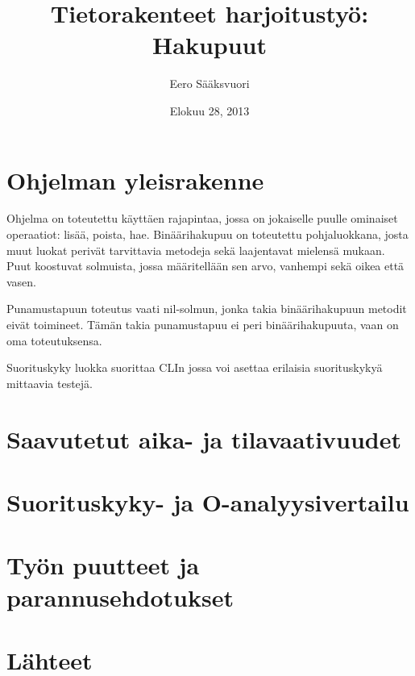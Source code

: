 \documentclass[12pt]{article}
\title{Tietorakenteet harjoitusty\"{o}: Hakupuut}
\author{Eero S\"{a}\"{a}ksvuori}
\date{Elokuu 28, 2013}
\begin{document}
\maketitle

\noindent


\section{Ohjelman yleisrakenne}

Ohjelma on toteutettu k\"{a}ytt\"{a}en rajapintaa, jossa on jokaiselle
puulle ominaiset operaatiot: lis\"{a}\"{a}, poista, hae. Bin\"{a}\"{a}rihakupuu
on toteutettu pohjaluokkana, josta muut luokat periv\"{a}t tarvittavia
metodeja sek\"{a} laajentavat mielens\"{a} mukaan. Puut koostuvat solmuista,
jossa m\"{a}\"{a}ritell\"{a}\"{a}n sen arvo, vanhempi sek\"{a} oikea ett\"{a} vasen. 

Punamustapuun toteutus vaati nil-solmun, jonka takia bin\"{a}\"{a}rihakupuun metodit eiv\"{a}t toimineet. T\"{a}m\"{a}n takia punamustapuu ei peri bin\"{a}\"{a}rihakupuuta, vaan on
oma toteutuksensa.

Suorituskyky luokka suorittaa CLIn jossa voi asettaa erilaisia suorituskyky\"{a}
mittaavia testej\"{a}.


\section{Saavutetut aika- ja tilavaativuudet}
\section{Suorituskyky- ja O-analyysivertailu}
\section{Ty\"{o}n puutteet ja parannusehdotukset}
\section{L\"{a}hteet}
\end{document}
